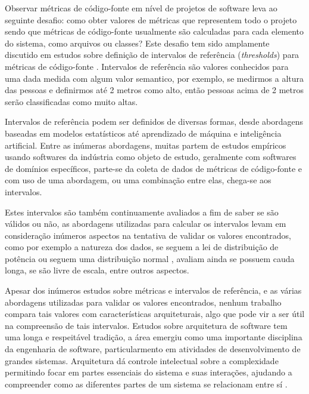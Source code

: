 Observar métricas de código-fonte em nível de projetos de software leva
ao seguinte desafio: como obter valores de métricas que representem todo o projeto sendo
que métricas de código-fonte usualmente são calculadas para cada elemento do sistema, como arquivos ou classes?
Este desafio tem sido amplamente discutido em estudos sobre definição de
intervalos de referência ({\it thresholds}) para métricas de
código-fonte \cite{Shatnawi2010, Kaur2013, Herbold2011}. Intervalos de
referência são valores conhecidos para uma dada medida
\cite[Chapter~2.1]{Lanza2007} com algum valor semantico, por exemplo, se
medirmos a altura das pessoas e definirmos até 2 metros como alto, então
pessoas acima de 2 metros serão classificadas como muito altas.

Intervalos de referência podem ser definidos de diversas formas, desde
abordagens baseadas em modelos estatísticos \cite{Shatnawi2010, Kaur2013}
até aprendizado de máquina \cite{Herbold2011} e inteligência artificial.
Entre as inúmeras abordagens, muitas partem de estudos empíricos
usando softwares da indústria como objeto de estudo, geralmente com
softwares de domínios específicos, parte-se da coleta de dados de
métricas de código-fonte e com uso de uma abordagem, ou uma combinação entre
elas, chega-se aos intervalos.

Estes intervalos são também continuamente avaliados a fim de saber se são
válidos ou não, as abordagens utilizadas para calcular os intervalos levam em
consideração inúmeros aspectos na tentativa de validar os valores encontrados,
como por exemplo a natureza dos dados, se seguem a lei de distribuição de
potência
\cite{Wheeldon2003,Potanin2005,Concas2007,Ferreira2009,Yao2009,Clauset2009} ou
seguem uma distribuição normal
\cite{Baxter2006,Lanza2007,Herraiz2011,Herraiz2012}, avaliam ainda se possuem
cauda longa, se são livre de escala, entre outros aspectos.

Apesar dos inúmeros estudos sobre métricas e intervalos de referência, e as
várias abordagens utilizadas para validar os valores encontrados, nenhum trabalho
compara tais valores com características arquiteturais,
algo que pode vir a ser útil na compreensão de tais intervalos.
Estudos sobre arquitetura de software tem uma longa e respeitável tradição, a
área emergiu como uma importante disciplina da engenharia de software,
particularmento em atividades de desenvolvimento de grandes sistemas.
Arquitetura dá controle intelectual sobre a complexidade permitindo focar em
partes essenciais do sistema e suas interações, ajudando a compreender como as
diferentes partes de um sistema se relacionam entre sí \cite{Clements2002Book}.

